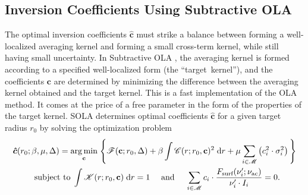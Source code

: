 %
%
%
\subsection{Inversion Coefficients Using Subtractive OLA}
The optimal inversion coefficients $\boldsymbol {\hat c}$ must strike a balance between forming a well-localized averaging kernel and forming a small cross-term kernel, while still having small uncertainty. 
In Subtractive OLA \citep[SOLA,][]{1992A&A...262L..33P, 1994A&A...281..231P}, the averaging kernel is formed according to a specified well-localized form (the ``target~kernel''), and the coefficients $\mathbf c$ are determined by minimizing the difference between the averaging kernel obtained and the target kernel. 
This is a fast implementation of the OLA method. 
It comes at the price of a free parameter in the form of the properties of the target kernel. 
SOLA determines optimal coefficients $\mathbf{\hat{c}}$ for a given target radius $r_0$ by solving the optimization problem 
%
\begin{align} \label{eq:opt}
        \boldsymbol {\hat c}(r_0; \beta, \mu, \Delta)
        =
        {}&\underset{\mathbf{c}}{\arg\min} \; \Bigg\{
            \mathscr{F}(\mathbf c; r_0, \Delta) 
          + \beta \int \mathscr{C}(r; r_0, \mathbf c)^2 \; \text{d}r 
          + \mu \sum_{i\in\mathscr{M}} \left( c_i^2 \cdot \sigma_i^2 \right)
         \Bigg\} 
         \notag\\\text{subject~to} & \; 
        \int{\mathscr{K}(r; r_0, \mathbf{c})} \; \text{d}r = 1
\quad\text{ and }\quad  \sum_{i\in\mathscr{M}} c_i \cdot \frac{F_{\text{surf}}(\nu'_i; \nu_{\text{ac}})}{\nu'_i \cdot I_i} = 0.
\end{align}
%
\iffalse
\begin{align} \label{eq:opt}
\boldsymbol {\hat c}(r_0; \beta, \mu, \Delta)
        =
        {}\underset{\mathbf{c}}{\arg\min} \; \Bigg\{
            &\mathscr{F}(\mathbf c; r_0, \Delta) 
    \notag\\+{}\beta \int \mathscr{C}(r; r_0, \mathbf c)^2 \; \text{d}r 
            +{}&{} \mu \sum_{i\in\mathscr{M}} \left( c_i^2 \cdot \sigma_i^2 \right)
         \Bigg\} 
         \notag\\
     \text{subject~to} \; 
        \int \mathscr{K}(r; r_0, \mathbf{c}) \;\text{d}r &= 1
\notag\\\text{and}\; \sum_{i\in\mathscr{M}} c_i \cdot \frac{F_{\text{surf}}(\nu'_{i}; \nu_{\text{ac}})}{\nu'_i \cdot I_{i}} &= 0.
\end{align}
\fi
